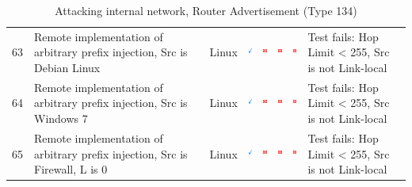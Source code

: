 \documentclass[12pt]{article}
\begin{document}
\begin{savenotes}
\begin{table}[!h]
{{\begin{tabular}{|C{1.0cm}|L{6.0cm}|C{1.5cm}|C{1.0cm}|C{1.0cm}|C{1.0cm}|C{1.0cm}|L{7.0cm}|}
63&Remote implementation of arbitrary prefix injection, Src is Debian Linux&Linux&\includegraphics[width=4mm, height=4mm]{ok}&\includegraphics[width=4mm, height=4mm]{notok}&\includegraphics[width=4mm, height=4mm]{notok}&\includegraphics[width=4mm, height=4mm]{notok}&Test fails: Hop Limit < 255, Src is not Link-local\\
64&Remote implementation of arbitrary prefix injection, Src is Windows 7&Linux&\includegraphics[width=4mm, height=4mm]{ok}&\includegraphics[width=4mm, height=4mm]{notok}&\includegraphics[width=4mm, height=4mm]{notok}&\includegraphics[width=4mm, height=4mm]{notok}&Test fails: Hop Limit < 255, Src is not Link-local\\
65&Remote implementation of arbitrary prefix injection, Src is Firewall, L is 0&Linux&\includegraphics[width=4mm, height=4mm]{ok}&\includegraphics[width=4mm, height=4mm]{notok}&\includegraphics[width=4mm, height=4mm]{notok}&\includegraphics[width=4mm, height=4mm]{notok}&Test fails: Hop Limit < 255, Src is not Link-local\\
\hline
\end{tabular}}}
\caption{Attacking internal network, Router Advertisement (Type 134)}
\label{table:attackInternalResults8}
\end{table}
\end{savenotes}
\end{document}
